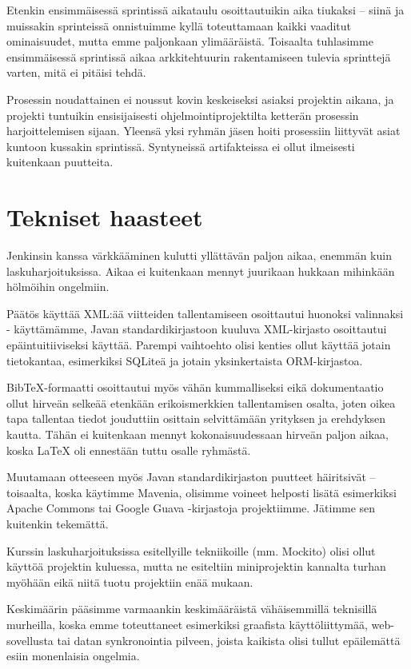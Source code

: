 \documentclass{article}
\begin{document}
Etenkin ensimmäisessä sprintissä aikataulu osoittautuikin aika tiukaksi -- siinä ja muissakin sprinteissä onnistuimme kyllä toteuttamaan kaikki vaaditut ominaisuudet, mutta emme paljonkaan ylimääräistä. Toisaalta tuhlasimme ensimmäisessä sprintissä aikaa arkkitehtuurin rakentamiseen tulevia sprinttejä varten, mitä ei pitäisi tehdä.

Prosessin noudattainen ei noussut kovin keskeiseksi asiaksi projektin aikana, ja projekti tuntuikin ensisijaisesti ohjelmointiprojektilta ketterän prosessin harjoittelemisen sijaan. Yleensä yksi ryhmän jäsen hoiti prosessiin liittyvät asiat kuntoon kussakin sprintissä. Syntyneissä artifakteissa ei ollut ilmeisesti kuitenkaan puutteita.



\section{Tekniset haasteet}

Jenkinsin kanssa värkkääminen kulutti yllättävän paljon aikaa, enemmän kuin laskuharjoituksissa. Aikaa ei kuitenkaan mennyt juurikaan hukkaan mihinkään hölmöihin ongelmiin.

Päätös käyttää XML:ää viitteiden tallentamiseen osoittautui huonoksi valinnaksi - käyttämämme, Javan standardikirjastoon kuuluva XML-kirjasto osoittautui epäintuitiiviseksi käyttää. Parempi vaihtoehto olisi kenties ollut käyttää jotain tietokantaa, esimerkiksi SQLiteä ja jotain yksinkertaista ORM-kirjastoa.

BibTeX-formaatti osoittautui myös vähän kummalliseksi eikä dokumentaatio ollut hirveän selkeää etenkään erikoismerkkien tallentamisen osalta, joten oikea tapa tallentaa tiedot jouduttiin osittain selvittämään yrityksen ja erehdyksen kautta. Tähän ei kuitenkaan mennyt kokonaisuudessaan hirveän paljon aikaa, koska LaTeX oli ennestään tuttu osalle ryhmästä.

Muutamaan otteeseen myös Javan standardikirjaston puutteet häiritsivät -- toisaalta, koska käytimme Mavenia, olisimme voineet helposti lisätä esimerkiksi Apache Commons tai Google Guava -kirjastoja projektiimme. Jätimme sen kuitenkin tekemättä.

Kurssin laskuharjoituksissa esitellyille tekniikoille (mm. Mockito) olisi ollut käyttöä projektin kuluessa, mutta ne esiteltiin miniprojektin kannalta turhan myöhään eikä niitä tuotu projektiin enää mukaan.

Keskimäärin pääsimme varmaankin keskimääräistä vähäisemmillä teknisillä murheilla, koska emme toteuttaneet esimerkiksi graafista käyttöliittymää, web-sovellusta tai datan synkronointia pilveen, joista kaikista olisi tullut epäilemättä esiin monenlaisia ongelmia.
\end{document}
